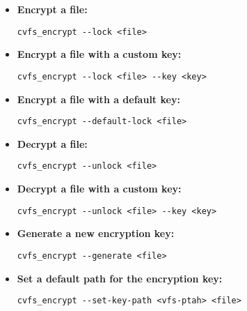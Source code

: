 \begin{itemize}
    \setlength\itemsep{-0.1em}
    \item \textbf{Encrypt a file:} \\
    \begin{BVerbatim}[baseline=t,boxwidth=10cm]
  cvfs_encrypt --lock <file>
    \end{BVerbatim}

    \item \textbf{Encrypt a file with a custom key:} \\
    \begin{BVerbatim}[baseline=t,boxwidth=10cm]
  cvfs_encrypt --lock <file> --key <key>
    \end{BVerbatim}

    \item \textbf{Encrypt a file with a default key:} \\
    \begin{BVerbatim}[baseline=t,boxwidth=10cm]
  cvfs_encrypt --default-lock <file>
    \end{BVerbatim}

    \item \textbf{Decrypt a file:} \\
    \begin{BVerbatim}[baseline=t,boxwidth=10cm]
  cvfs_encrypt --unlock <file>
    \end{BVerbatim}

    \item \textbf{Decrypt a file with a custom key:} \\
    \begin{BVerbatim}[baseline=t,boxwidth=10cm]
  cvfs_encrypt --unlock <file> --key <key>
    \end{BVerbatim}

    \item \textbf{Generate a new encryption key:} \\
    \begin{BVerbatim}[baseline=t,boxwidth=10cm]
  cvfs_encrypt --generate <file>
    \end{BVerbatim}

    \item \textbf{Set a default path for the encryption key:} \\
    \begin{BVerbatim}[baseline=t,boxwidth=10cm]
  cvfs_encrypt --set-key-path <vfs-ptah> <file>
    \end{BVerbatim}
\end{itemize}

